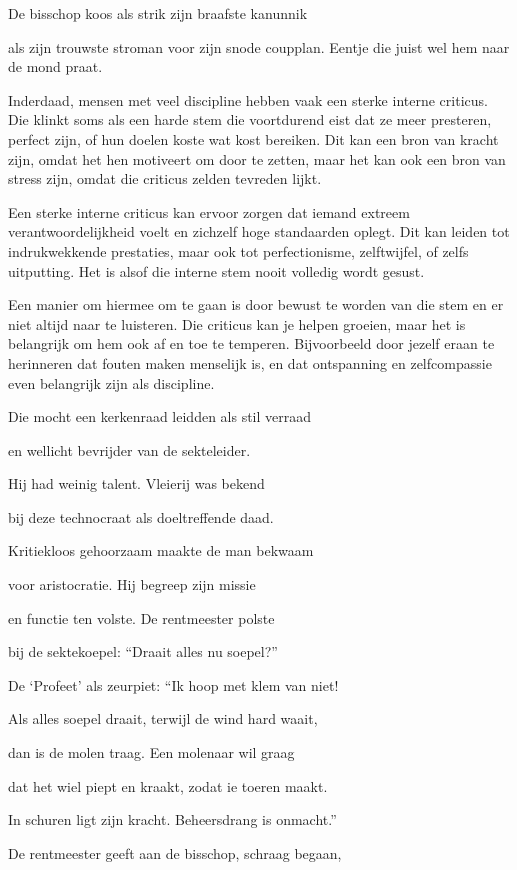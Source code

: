De bisschop koos als strik
zijn braafste kanunnik

als zijn trouwste stroman
voor zijn snode coupplan.
Eentje die juist wel hem naar de mond praat.

Inderdaad, mensen met veel discipline hebben vaak een sterke interne criticus. Die klinkt soms als een harde stem die voortdurend eist dat ze meer presteren, perfect zijn, of hun doelen koste wat kost bereiken. Dit kan een bron van kracht zijn, omdat het hen motiveert om door te zetten, maar het kan ook een bron van stress zijn, omdat die criticus zelden tevreden lijkt.

Een sterke interne criticus kan ervoor zorgen dat iemand extreem verantwoordelijkheid voelt en zichzelf hoge standaarden oplegt. Dit kan leiden tot indrukwekkende prestaties, maar ook tot perfectionisme, zelftwijfel, of zelfs uitputting. Het is alsof die interne stem nooit volledig wordt gesust.

Een manier om hiermee om te gaan is door bewust te worden van die stem en er niet altijd naar te luisteren. Die criticus kan je helpen groeien, maar het is belangrijk om hem ook af en toe te temperen. Bijvoorbeeld door jezelf eraan te herinneren dat fouten maken menselijk is, en dat ontspanning en zelfcompassie even belangrijk zijn als discipline.

Die mocht een kerkenraad
leidden als stil verraad

en wellicht bevrijder
van de sekteleider.

Hij had weinig talent.
Vleierij was bekend

bij deze technocraat
als doeltreffende daad.

Kritiekloos gehoorzaam
maakte de man bekwaam

voor aristocratie.
Hij begreep zijn missie

en functie ten volste.
De rentmeester polste

bij de sektekoepel:
“Draait alles nu soepel?”

De ‘Profeet’ als zeurpiet:
“Ik hoop met klem van niet!

Als alles soepel draait,
terwijl de wind hard waait,

dan is de molen traag.
Een molenaar wil graag

dat het wiel piept en kraakt,
zodat ie toeren maakt.

In schuren ligt zijn kracht.
Beheersdrang is onmacht.”

De rentmeester geeft aan
de bisschop, schraag begaan,

